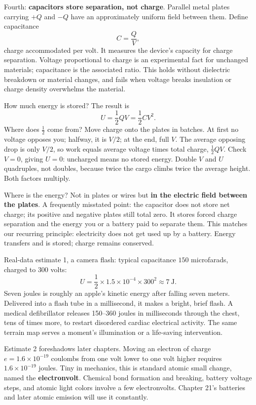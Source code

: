 \begin{mainline}
Fourth: \textbf{capacitors store separation, not charge}. Parallel metal plates carrying \(+Q\) and \(-Q\) have an approximately uniform field between them. Define capacitance
\[
C = \frac{Q}{V},
\]
charge accommodated per volt. It measures the device's capacity for charge separation. Voltage proportional to charge is an experimental fact for unchanged materials; capacitance is the associated ratio. This holds without dielectric breakdown or material changes, and fails when voltage breaks insulation or charge density overwhelms the material.

How much energy is stored? The result is
\[
U = \frac{1}{2}QV = \frac{1}{2}CV^2 .
\]
Where does \(\frac{1}{2}\) come from? Move charge onto the plates in batches. At first no voltage opposes you; halfway, it is \(V/2\); at the end, full \(V\). The average opposing drop is only \(V/2\), so work equals average voltage times total charge, \(\frac{1}{2}QV\). Check \(V=0\), giving \(U=0\): uncharged means no stored energy. Double \(V\) and \(U\) quadruples, not doubles, because twice the cargo climbs twice the average height. Both factors multiply.

Where is the energy? Not in plates or wires but \textbf{in the electric field between the plates}. A frequently misstated point: the capacitor does not store net charge; its positive and negative plates still total zero. It stores forced charge separation and the energy you or a battery paid to separate them. This matches our recurring principle: electricity does not get used up by a battery. Energy transfers and is stored; charge remains conserved.

Real-data estimate 1, a camera flash: typical capacitance \(150\) microfarads, charged to \(300\) volts:
\[
U=\frac12\times 1.5\times10^{-4}\times 300^2 \approx 7\ \text{J} .
\]
Seven joules is roughly an apple's kinetic energy after falling seven meters. Delivered into a flash tube in a millisecond, it makes a bright, brief flash. A medical defibrillator releases 150--360 joules in milliseconds through the chest, tens of times more, to restart disordered cardiac electrical activity. The same terrain map serves a moment's illumination or a life-saving intervention.

Estimate 2 foreshadows later chapters. Moving an electron of charge \(e = 1.6\times10^{-19}\) coulombs from one volt lower to one volt higher requires \(1.6\times10^{-19}\) joules. Tiny in mechanics, this is standard atomic small change, named the \textbf{electronvolt}. Chemical bond formation and breaking, battery voltage steps, and atomic light colors involve a few electronvolts. Chapter 21's batteries and later atomic emission will use it constantly.
\end{mainline}

